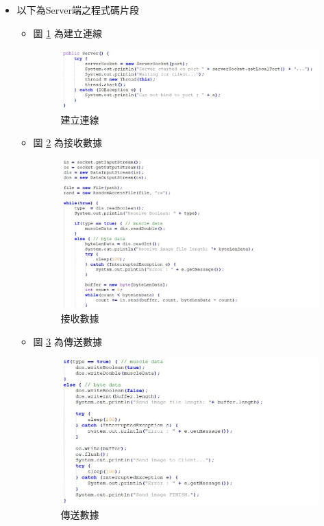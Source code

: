 \documentclass[12pt]{article}  %
\theoremstyle{plain}
\begin{document}
\begin{itemize}
\item 以下為Server端之程式碼片段
\begin{itemize}
\item 圖 \ref{S建立連線} 為建立連線
\begin{figure}[htbp]
\centering
\includegraphics[width=10cm]{pic/ch2/code-Server.JPG}
\caption{建立連線} \label{S建立連線}
\end{figure}
\item 圖 \ref{S接收數據} 為接收數據
\begin{figure}[htbp]
\centering
\includegraphics[width=10cm]{pic/ch2/code-Server2.JPG}
\caption{接收數據} \label{S接收數據}
\end{figure}
\item 圖 \ref{S傳送數據} 為傳送數據
\begin{figure}[htbp]
\centering
\includegraphics[width=10cm]{pic/ch2/code-Server3.JPG}
\caption{傳送數據} \label{S傳送數據}
\end{figure}
\end{itemize}
\newpage


\end{itemize}
\end{document}
